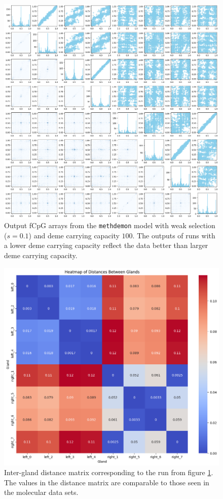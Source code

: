 \begin{figure}[h]
    \centering
    \includegraphics[width=\textwidth]{Chapter_5/figures/100plot.png}
    \caption{Output fCpG arrays from the \texttt{methdemon} model with weak
    selection ($s=0.1$) and deme carrying capacity $100$. The outputs of runs
    with a lower deme carrying capacity reflect the data better than larger
    deme carrying capacity.}
    \label{fig:methdemon_weak_selection_small}
\end{figure}

\begin{figure}[h]
    \centering
    \includegraphics[width=\textwidth]{Chapter_5/figures/100dist.png}
    \caption{Inter-gland distance matrix corresponding to the run from figure
    \ref{fig:methdemon_weak_selection_small}. The values in the distance matrix
    are comparable to those seen in the molecular data sets.}
    \label{fig:methdemon_weak_dist_small}
\end{figure}
\clearpage

